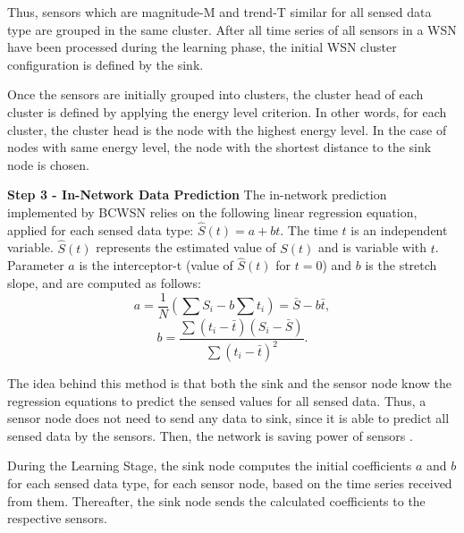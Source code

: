 \documentclass{acm_proc_article-sp}
\begin{document}
Thus, sensors which are magnitude-M and trend-T similar for all sensed data
type are grouped in the same cluster. After all time series of all sensors
in a WSN have been processed during the learning phase, the initial WSN cluster
configuration is defined by the sink.
\vspace*{-.3cm}

Once the sensors are initially grouped into clusters, the cluster head of each
cluster is defined by applying the energy level criterion.
In other words, for each cluster, the cluster head is the node with the highest
energy level. In the case of nodes with same energy level, the node with the
shortest distance to the sink node is chosen.
\vspace*{-.3cm}

{\bf Step 3 - In-Network Data Prediction}
The in-network prediction implemented by BCWSN relies on the
following linear regression equation, applied for each sensed data type:
$\hat{S}(t) = a + bt$.
The time $t$ is an independent variable. $\hat{S}(t)$ represents the estimated
value of $S(t)$ and is variable with $t$. Parameter $a$ is the interceptor-t
(value of $\hat{S}(t)$ for $t=0$) and $b$ is the stretch slope, and are computed
as follows:
\begin{equation}
\label{coef-a}
	a = \frac{1}{N}\left(\sum S_{i} - b\sum t_{i} \right) = \bar{S} - b\bar{t},
\end{equation}
\vspace*{-.3cm}
\begin{equation}
\label{coef-b}
	b = \frac{\sum \left(t_{i} - \bar{t}\right)\left(S_{i} - \bar{S}\right)}{\sum \left(t_{i} - \bar{t}\right)^{2}}.
\end{equation}
\vspace*{-.3cm}

The idea behind this method is that both the sink and the sensor node know the
regression equations to predict the sensed values for all sensed data. Thus, a
sensor node does not need to send any data to sink, since it is able to predict
all sensed data by the sensors. Then, the network is saving power of sensors
\cite{MaiaACR2013}.
\vspace*{-.3cm}

During the Learning Stage, the sink node computes the initial coefficients $a$
and $b$ for each sensed data type, for each sensor node, based on the time
series received from them. Thereafter, the sink node sends the calculated
coefficients to the respective sensors.
\vspace*{-.3cm}
\end{document}
